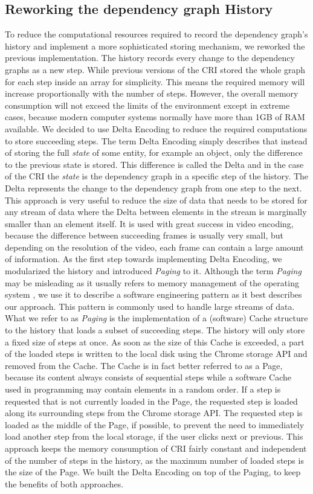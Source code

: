 \subsection{Reworking the dependency graph History}
To reduce the computational resources required to record the dependency graph's history and implement a more sophisticated storing mechanism, we reworked the previous implementation. The history records every change to the dependency graphs as a new step. While previous versions of the CRI stored the whole graph for each step inside an array for simplicity. This means the required memory will increase proportionally with the number of steps. However, the overall memory consumption will not exceed the limits of the environment except in extreme cases, because modern computer systems normally have more than 1GB of RAM available. We decided to use Delta Encoding to reduce the required computations to store succeeding steps. The term Delta Encoding simply describes that instead of storing the full \emph{state} of some entity, for example an object, only the difference to the previous state is stored. This difference is called the Delta and in the case of the CRI %
 the \emph{state} is the dependency graph in a specific step of the history. The Delta represents the change to the dependency graph from one step to the next. This approach is very useful to reduce the size of data that needs to be stored for any stream of data where the Delta between elements in the stream is marginally smaller than an element itself. It is used with great success in video encoding, because the difference between succeeding frames is usually very small, but depending on the resolution of the video, each frame can contain a large amount of information.
As the first step towards implementing Delta Encoding, we modularized the history and introduced \emph{Paging} to it. Although the term \emph{Paging} may be misleading as it usually refers to memory management of the operating system \cite{PagingWiki}, we use it to describe a software engineering pattern as it best describes our approach. This pattern is commonly used to handle large streams of data. What we refer to as \emph{Paging} is the implementation of a (software) Cache structure to the history that loads a subset of succeeding steps. The history will only store a fixed size of steps at once. As soon as the size of this Cache is exceeded, a part of the loaded steps is written to the local disk using the Chrome storage API and removed from the Cache. The Cache is in fact better referred to as a Page, because its content always consists of sequential steps while a software Cache used in programming may contain elements in a random order. If a step is requested that is not currently loaded in the Page, the requested step is loaded along its surrounding steps from the Chrome storage API. The requested step is loaded as the middle of the Page, if possible, to prevent the need to immediately load another step from the local storage, if the user clicks next or previous. This approach keeps the memory consumption of CRI fairly constant and independent of the number of steps in the history, as the maximum number of loaded steps is the size of the Page. We built the Delta Encoding on top of the Paging, to keep the benefits of both approaches.
